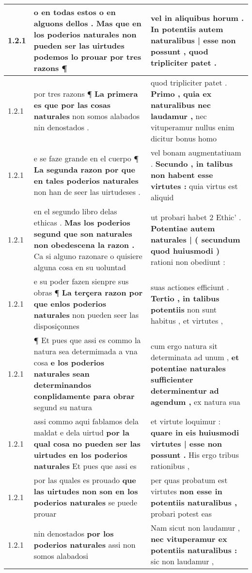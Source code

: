 \begin{tabular}{|p{1cm}|p{6.5cm}|p{6.5cm}|}
1.2.1 & o en todas estos o en alguons dellos . \textbf{ Mas que en los poderios naturales non pueden ser las uirtudes podemos lo prouar } por tres razons ¶ & vel in aliquibus horum . \textbf{ In potentiis autem naturalibus | esse non possunt , } quod tripliciter patet . \\\hline
1.2.1 & por tres razons ¶ \textbf{ La primera es que por las cosas naturales } non somos alabados nin denostados . & quod tripliciter patet . \textbf{ Primo , quia ex naturalibus nec laudamur , } nec vituperamur nullus enim dicitur bonus homo \\\hline
1.2.1 & e se faze grande en el cuerpo ¶ \textbf{ La segunda razon por que en tales poderios naturales } non han de seer las uirtudeses . & vel bonam augmentatiuam . \textbf{ Secundo , in talibus non habent esse virtutes : } quia virtus est aliquid \\\hline
1.2.1 & en el segundo libro delas ethicas . \textbf{ Mas los poderios segund que son naturales non obedescena la razon . } Ca si alguno razonare o quisiere alguna cosa en su uoluntad & ut probari habet 2 Ethic’ . \textbf{ Potentiae autem naturales | ( secundum quod huiusmodi ) } rationi non obediunt : \\\hline
1.2.1 & e su poder fazen sienpre sus obras ¶ \textbf{ La terçera razon por que enlos poderios naturales } non pueden seer las disposiçonnes & suas actiones efficiunt . \textbf{ Tertio , in talibus potentiis } non sunt habitus , et virtutes , \\\hline
1.2.1 & ¶ Et pues que assi es commo la natura sea determimada a vna cosa \textbf{ e los poderios naturales sean determinandos conplidamente para obrar } segund su natura & cum ergo natura sit determinata ad unum , \textbf{ et potentiae naturales sufficienter determinentur ad agendum , } ex natura sua \\\hline
1.2.1 & assi commo aqui fablamos dela maldat e dela uirtud \textbf{ por la qual cosa no pueden ser las uirtudes en los poderios naturales } Et pues que assi es & et virtute loquimur : \textbf{ quare in eis huiusmodi virtutes | esse non possunt . } His ergo tribus rationibus , \\\hline
1.2.1 & por las quales es prouado \textbf{ que las uirtudes non son en los poderios naturales } se puede prouar & per quas probatum est virtutes \textbf{ non esse in potentiis naturalibus , } probari potest eas \\\hline
1.2.1 & nin denostados \textbf{ por los poderios naturales } assi non somos alabadosi & Nam sicut non laudamur , \textbf{ nec vituperamur ex potentiis naturalibus : } sic non laudamur , \\\hline

\end{tabular}
